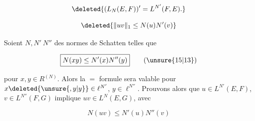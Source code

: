 \[
\deleted{(L_N(E,F))'=L^{N'}(F,E).}
\]


\[
\deleted{\lVert uv\rVert_1\leq N(u)N'(v)}
\]

 Soient $N,N'\ N''$ des normes de Schatten telles que

\[
\boxed{N(xy)\leq N'(x)N''(y)}\tag*{(\unsure{15|13})}
\]

pour  $x,y\in R^{(N)}$. Alors la $=$ formule sera valable pour $x\deleted{\unsure{,y|y}}\in\ell^{N'}$, $y\in\ell^{N''}$. Prouvons alors que $u\in L^{N'}(E,F)$, $v\in L^{N''}(F,G)$ implique $uv\in L^N(E,G)$, avec

\[
\boxed{N(uv)\leq N'(u)N''(v)}\tag*{(16)}
\]

